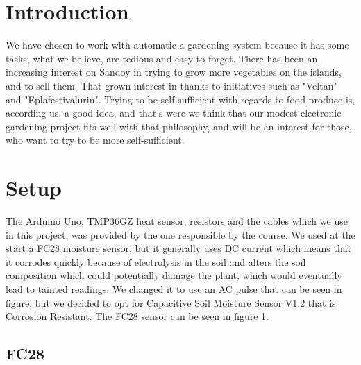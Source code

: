 \documentclass{article}
\begin{document}
\pagebreak
{}
\section{Introduction}

We have chosen to work with automatic a gardening system because it has some tasks, what we believe, are tedious and easy to forget. There has been an increasing interest on Sandoy in trying to grow more vegetables on the islands, and to sell them. That grown interest in thanks to initiatives such as "Veltan" and "Eplafestivalurin". Trying to be self-sufficient with regards to food produce is, according us, a good idea, and that's were we think that our modest electronic gardening project fits well with that philosophy, and will be an interest for those, who want to try to be more self-sufficient.
 
\section{Setup}
The Arduino Uno, TMP36GZ heat sensor, resistors and the cables which we use in this project, was provided by the one responsible by the course. We used at the start a FC28 moisture sensor, but it generally uses DC current which means that it corrodes quickly because of electrolysis in the soil and alters the soil composition which could potentially damage the plant, which would eventually lead to tainted readings. We changed it to use an AC pulse that can be seen in figure, but we decided to opt for Capacitive Soil Moisture Sensor V1.2 that is Corrosion Resistant. The FC28 sensor can be seen in figure 1.

\subsection{FC28}
\end{document}
